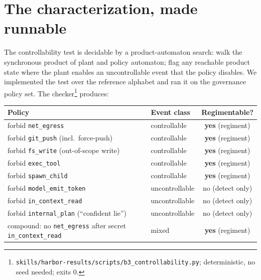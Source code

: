 \documentclass[11pt,a4paper]{article}  \usepackage{mdframed} \usepackage{graphicx}
\begin{document}
\section{The characterization, made runnable}\label{sec:table} The controllability test is decidable by a product-automaton
search: walk the synchronous product of plant and policy automaton; flag any reachable product state where the plant enables
an uncontrollable event that the policy disables. We implemented the test over the reference alphabet and ran it on the
governance policy set. The checker\footnote{\texttt{skills/harbor-results/scripts/b3\_controllability.py}; deterministic, no
seed needed; exits 0.} produces:

\begin{center} \begin{tabular}{@{}llc@{}} \toprule Policy & Event class & Regimentable? \\ \midrule forbid
\texttt{net\_egress} & controllable & \textbf{yes} (regiment) \\ forbid \texttt{git\_push} (incl.\ force-push) & controllable
& \textbf{yes} (regiment) \\ forbid \texttt{fs\_write} (out-of-scope write) & controllable & \textbf{yes} (regiment) \\
forbid \texttt{exec\_tool} & controllable & \textbf{yes} (regiment) \\ forbid \texttt{spawn\_child} & controllable &
\textbf{yes} (regiment) \\ forbid \texttt{model\_emit\_token} & uncontrollable & no (detect only) \\ forbid
\texttt{in\_context\_read} & uncontrollable & no (detect only) \\ forbid \texttt{internal\_plan} (``confident lie'') &
uncontrollable & no (detect only) \\ \midrule compound: no \texttt{net\_egress} after secret \texttt{in\_context\_read} &
mixed & \textbf{yes} (regiment) \\ \bottomrule \end{tabular} \end{center}
\end{document}
